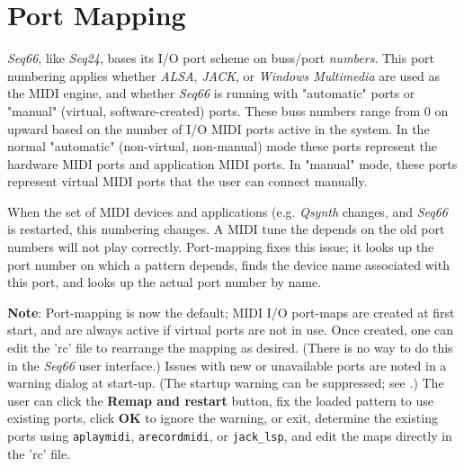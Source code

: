%
%
%

\section{Port Mapping}
\label{sec:port_mapping}

   \textsl{Seq66}, like \textsl{Seq24}, bases its I/O port scheme on buss/port
   \textsl{numbers}.
   This port numbering applies whether
   \textsl{ALSA}, \textsl{JACK}, or \textsl{Windows Multimedia}
   are used as the MIDI engine, and whether \textsl{Seq66} is running with
   "automatic" ports or "manual" (virtual, software-created) ports.
   These buss numbers range from 0 on upward
   based on the number of I/O MIDI ports active in the system.
   In the normal "automatic" (non-virtual, non-manual) mode
   these ports represent the hardware MIDI ports and application MIDI ports.
   In "manual" mode, these ports represent virtual MIDI ports that the user
   can connect manually.

   When the set of MIDI devices and applications (e.g. \textsl{Qsynth}
   changes, and \textsl{Seq66} is restarted, this numbering changes.
   A MIDI tune the depends on the old port numbers will not play correctly.
   Port-mapping fixes this issue; it looks up the port number on which a
   pattern depends, finds the device name associated with this port,
   and looks up the actual port number by name.

   \textbf{Note}:
   Port-mapping is now the default; MIDI I/O port-maps are
   created at first start, and are always active if virtual ports are not in
   use.
   Once created, one can edit the 'rc' file to rearrange the mapping as desired.
   (There is no way to do this in the \textsl{Seq66} user interface.)
   Issues with new or unavailable ports are
   noted in a warning dialog at start-up.
   (The startup warning can be suppressed;
   see .)
   The user can click the \textbf{Remap and restart} button,
   fix the loaded pattern to use existing ports, click \textbf{OK} to ignore
   the warning,
   or exit, determine the existing ports using
   \texttt{aplaymidi}, \texttt{arecordmidi}, or \texttt{jack\_lsp},
   and edit the maps directly in the 'rc' file.

